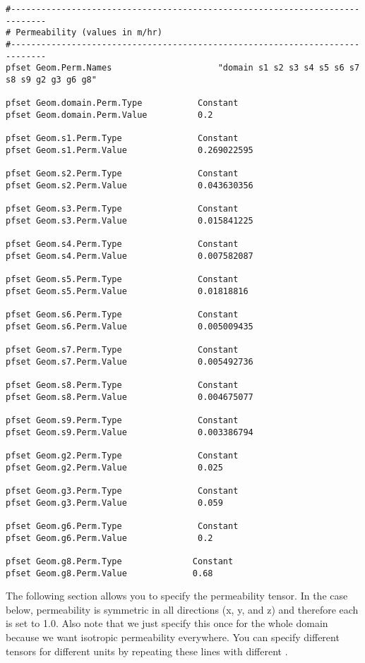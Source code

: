\begin{verbatim}
#-----------------------------------------------------------------------------
# Permeability (values in m/hr)
#-----------------------------------------------------------------------------
pfset Geom.Perm.Names                     "domain s1 s2 s3 s4 s5 s6 s7 s8 s9 g2 g3 g6 g8"

pfset Geom.domain.Perm.Type           Constant
pfset Geom.domain.Perm.Value          0.2

pfset Geom.s1.Perm.Type               Constant
pfset Geom.s1.Perm.Value              0.269022595

pfset Geom.s2.Perm.Type               Constant
pfset Geom.s2.Perm.Value              0.043630356

pfset Geom.s3.Perm.Type               Constant
pfset Geom.s3.Perm.Value              0.015841225

pfset Geom.s4.Perm.Type               Constant
pfset Geom.s4.Perm.Value              0.007582087

pfset Geom.s5.Perm.Type               Constant
pfset Geom.s5.Perm.Value              0.01818816

pfset Geom.s6.Perm.Type               Constant
pfset Geom.s6.Perm.Value              0.005009435

pfset Geom.s7.Perm.Type               Constant
pfset Geom.s7.Perm.Value              0.005492736

pfset Geom.s8.Perm.Type               Constant
pfset Geom.s8.Perm.Value              0.004675077

pfset Geom.s9.Perm.Type               Constant
pfset Geom.s9.Perm.Value              0.003386794

pfset Geom.g2.Perm.Type               Constant
pfset Geom.g2.Perm.Value              0.025

pfset Geom.g3.Perm.Type               Constant
pfset Geom.g3.Perm.Value              0.059

pfset Geom.g6.Perm.Type               Constant
pfset Geom.g6.Perm.Value              0.2

pfset Geom.g8.Perm.Type              Constant
pfset Geom.g8.Perm.Value             0.68
\end{verbatim}

The following section allows you to specify the permeability tensor.  
In the case below, permeability is symmetric in all directions (x, y, and z) and therefore each is set to 1.0.
Also note that we just specify this once for the whole domain because we want isotropic
permeability everywhere. You can specify different tensors for different units by repeating 
these lines with different .

